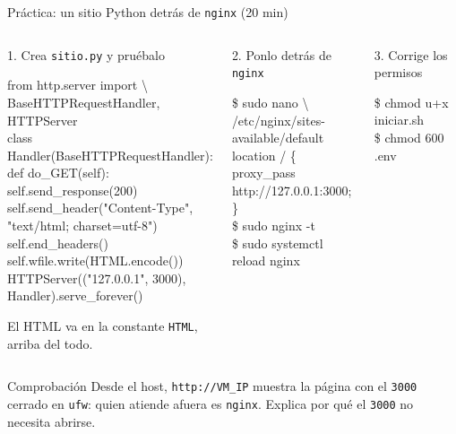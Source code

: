 \documentclass[aspectratio=169,10pt,c]{beamer}
\begin{document}
\begin{frame}{Práctica: un sitio Python detrás de \texttt{nginx} \textnormal{\small(20 min)}}
\begin{columns}[T,onlytextwidth]
\begin{exampleblock}{1. Crea \texttt{sitio.py} y pruébalo}
\begin{terminal}\scriptsize
from http.server import \textbackslash\\
\quad BaseHTTPRequestHandler, HTTPServer\\
class Handler(BaseHTTPRequestHandler):\\
\quad def do\_GET(self):\\
\quad\quad self.send\_response(200)\\
\quad\quad self.send\_header("Content-Type",\\
\quad\quad\quad "text/html; charset=utf-8")\\
\quad\quad self.end\_headers()\\
\quad\quad self.wfile.write(HTML.encode())\\
HTTPServer(("127.0.0.1", 3000),\\
\quad Handler).serve\_forever()
\end{terminal}
\small El HTML va en la constante \texttt{HTML}, arriba del todo.
\end{exampleblock}
\begin{exampleblock}{2. Ponlo detrás de \texttt{nginx}}
\begin{terminal}\scriptsize
\$ sudo nano \textbackslash\\
\quad /etc/nginx/sites-available/default\\
location / \{\\
\quad proxy\_pass http://127.0.0.1:3000;\\
\}\\
\$ sudo nginx -t\\
\$ sudo systemctl reload nginx
\end{terminal}
\end{exampleblock}
\begin{exampleblock}{3. Corrige los permisos}
\begin{terminal}\scriptsize
\$ chmod u+x iniciar.sh\\
\$ chmod 600 .env
\end{terminal}
\end{exampleblock}
\end{columns}
\begin{block}{Comprobación}
\small Desde el host, \texttt{http://VM\_IP} muestra la página con el \texttt{3000} cerrado en \texttt{ufw}: quien atiende afuera es \texttt{nginx}. Explica por qué el \texttt{3000} no necesita abrirse.
\end{block}
\end{frame}
\end{document}
